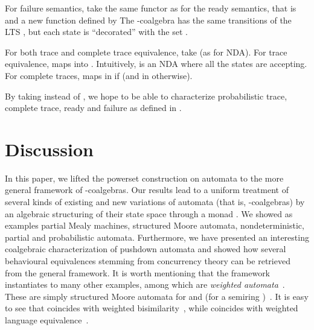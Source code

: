 \documentclass{LMCS}
\begin{document}
For failure semantics, take the same functor as for the ready semantics, that is  
and a new function 
defined  by 
The -coalgebra  has the same
transitions of the LTS , but each state  is ``decorated''
with the set .



For both trace and complete trace equivalence, take  (as for NDA). For trace equivalence,
 maps 
into . Intuitively,  is
an NDA where all the states are accepting.
For complete traces,  maps
 in  if  (and in
 otherwise).

By taking  instead of , we hope to be able to 
 characterize probabilistic trace, complete trace, ready and
failure as defined in \cite{JouS90}. 
















\section{Discussion}\label{sec:discussion}
In this paper, we lifted the powerset construction on automata to the
more general framework of -coalgebras.
Our results lead to a uniform treatment of several kinds of
existing and new variations of automata (that is,
-coalgebras) by an algebraic structuring of their state space through a monad .
 We showed as examples partial Mealy
machines, structured Moore automata, nondeterministic, partial and
 probabilistic automata. Furthermore, we have presented an interesting coalgebraic characterization of pushdown automata and showed how several behavioural equivalences stemming from 
 concurrency theory can be retrieved from the general framework. It is worth
mentioning that the framework instantiates to many other examples,
among which are \emph{weighted automata}~\cite{Schutzenberger61b}. These
are simply structured Moore automata for  and
 (for a semiring
)~\cite{gumm}.
It is easy to see that  coincides with weighted
bisimilarity~\cite{german}, while  coincides with
weighted language equivalence~\cite{Schutzenberger61b}.

\medskip
\end{document}
